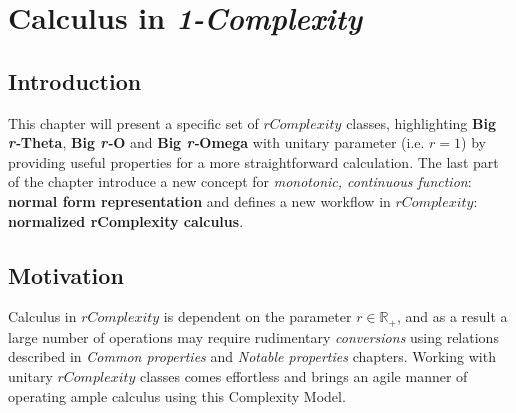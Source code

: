 
\chapter{Calculus in {\textit{1-Complexity}} }




\section{Introduction}
This chapter will present a specific set of $rComplexity$ classes, highlighting \textbf{Big \textit{r-}Theta}, \textbf{Big \textit{r-}O} and \textbf{Big \textit{r-}Omega} with unitary parameter (i.e. $r = 1$) by providing useful properties for a more straightforward calculation. The last part of the chapter introduce a new concept for \textit{monotonic, continuous function}: \textbf{normal form representation} and defines a new workflow in $rComplexity$: \textbf{normalized rComplexity calculus}.

\section{Motivation}
Calculus in $rComplexity$ is dependent on the parameter $r \in \mathbb{R}_{+}$, and as a result a large number of operations may require rudimentary \textit{conversions} using relations described in \textit{Common properties} and \textit{Notable properties} chapters. Working with unitary $rComplexity$ classes comes effortless and brings an agile manner of operating ample
calculus using this Complexity Model.

